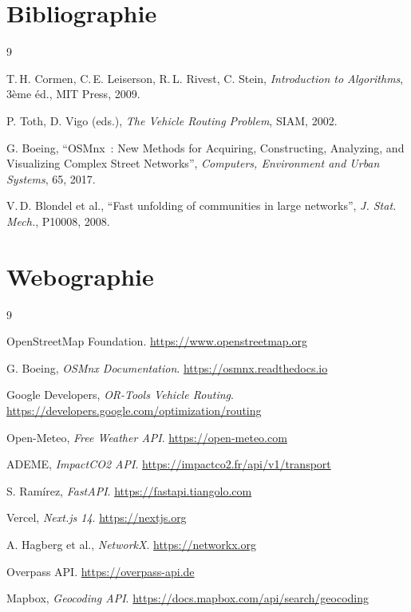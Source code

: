 \documentclass[a4paper, 12pt, twoside]{article}
\begin{document}
\section{Bibliographie}
\renewcommand{\bibname}{}
\renewcommand{\refname}{}
\begin{thebibliography}{9}

    T.\,H. Cormen, C.\,E. Leiserson, R.\,L. Rivest, C. Stein,
    {\it Introduction to Algorithms}, 3\`{e}me \'{e}d., MIT Press, 2009.

    P. Toth, D. Vigo (eds.),
    {\it The Vehicle Routing Problem},
    SIAM, 2002.

    G. Boeing, ``OSMnx~: New Methods for Acquiring, Constructing, Analyzing, and
    Visualizing Complex Street Networks'',
    {\it Computers, Environment and Urban Systems}, 65, 2017.

    V.\,D. Blondel et al.,
    ``Fast unfolding of communities in large networks'',
    {\it J. Stat. Mech.}, P10008, 2008.

\end{thebibliography}

\section{Webographie}
\begin{thebibliography}{9}

    OpenStreetMap Foundation. \url{https://www.openstreetmap.org}

    G. Boeing, {\it OSMnx Documentation}. \url{https://osmnx.readthedocs.io}

    Google Developers, {\it OR-Tools Vehicle Routing}.
    \url{https://developers.google.com/optimization/routing}

    Open-Meteo, {\it Free Weather API}. \url{https://open-meteo.com}

    ADEME, {\it ImpactCO2 API}. \url{https://impactco2.fr/api/v1/transport}

    S. Ram\'{i}rez, {\it FastAPI}. \url{https://fastapi.tiangolo.com}

    Vercel, {\it Next.js 14}. \url{https://nextjs.org}

    A. Hagberg et al., {\it NetworkX}. \url{https://networkx.org}

    Overpass API. \url{https://overpass-api.de}

    Mapbox, {\it Geocoding API}. \url{https://docs.mapbox.com/api/search/geocoding}

\end{thebibliography}
\end{document}
